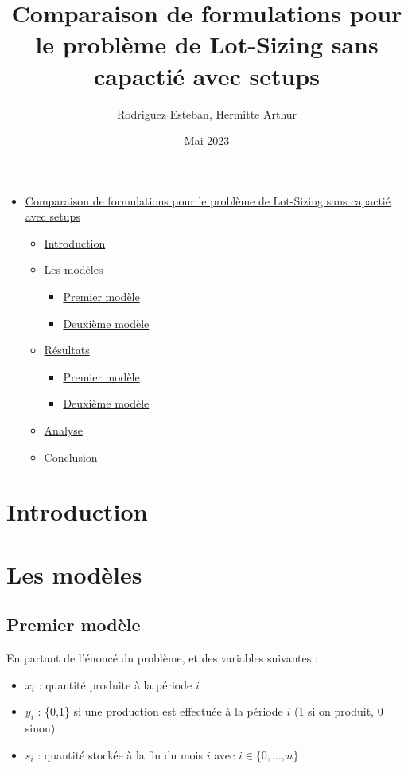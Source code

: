 \documentclass[10pt]{article}
\title{Comparaison de formulations pour le problème de Lot-Sizing sans capactié avec setups}
\author{Rodriguez Esteban, Hermitte Arthur}
\date{Mai 2023}
\begin{document}
\maketitle
\makeatletter
\let\mytitle\@title
\let\myauthor\@author
\let\mydate\@date
\makeatother
\begin{itemize}
  \item \href{#comparaison-de-formulations-pour-le-probl%C3%A8me-de-lot-sizing-sans-capacti%C3%A9-avec-setups}{Comparaison de formulations pour le problème de Lot-Sizing sans capactié avec setups}
  \begin{itemize}
    \item \href{#introduction}{Introduction}
    \item \href{#les-mod%C3%A8les}{Les modèles}
    \begin{itemize}
      \item \href{#premier-mod%C3%A8le}{Premier modèle}
      \item \href{#deuxi%C3%A8me-mod%C3%A8le}{Deuxième modèle}
    \end{itemize}
    \item \href{#r%C3%A9sultats}{Résultats}
    \begin{itemize}
      \item \href{#premier-mod%C3%A8le-1}{Premier modèle}
      \item \href{#deuxi%C3%A8me-mod%C3%A8le-1}{Deuxième modèle}
    \end{itemize}
    \item \href{#analyse}{Analyse}
    \item \href{#conclusion}{Conclusion}
  \end{itemize}
\end{itemize}

\section*{Introduction}

\section*{Les modèles}

\subsection*{Premier modèle}
En partant de l'énoncé du problème, et des variables suivantes :

\begin{itemize}
  \item $x_{i}$ : quantité produite à la période $i$
  \item $y_{i}$ : \{0,1\} si une production est effectuée à la période $i$ (1 si on produit, 0 sinon)
  \item $s_{i}$ : quantité stockée à la fin du mois $i$
avec $i \in \{0,..., n\}$
\end{itemize}
\end{document}
